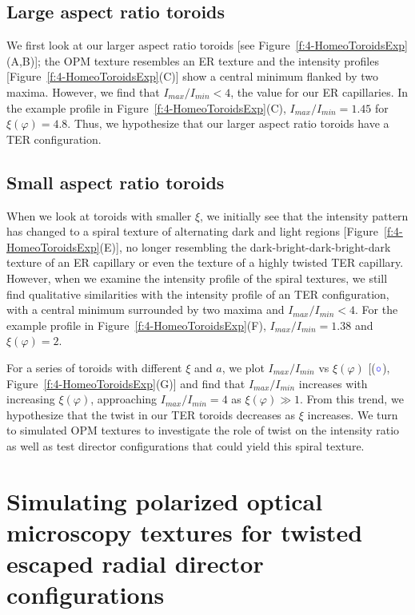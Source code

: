 \subsection{Large aspect ratio toroids}
We first look at our larger aspect ratio toroids [see Figure~\ref{f:4-HomeoToroidsExp}(A,B)]; the OPM texture resembles an ER texture and the intensity profiles [Figure~\ref{f:4-HomeoToroidsExp}(C)] show a central minimum flanked by two maxima.
However, we find that $I_{max}/I_{min} < 4$, the value for our ER capillaries.
In the example profile in Figure~\ref{f:4-HomeoToroidsExp}(C), $I_{max}/I_{min} = 1.45$ for $\xi(\varphi) = 4.8$.
Thus, we hypothesize that our larger aspect ratio toroids have a TER configuration.


\subsection{Small aspect ratio toroids}
When we look at toroids with smaller $\xi$, we initially see that the intensity pattern has changed to a spiral texture of alternating dark and light regions [Figure~\ref{f:4-HomeoToroidsExp}(E)], no longer resembling the dark-bright-dark-bright-dark texture of an ER capillary or even the texture of a highly twisted TER capillary.
However, when we examine the intensity profile of the spiral textures, we still find qualitative similarities with the intensity profile of an TER configuration, with a central minimum surrounded by two maxima and $I_{max}/I_{min} < 4$.
For the example profile in Figure~\ref{f:4-HomeoToroidsExp}(F), $I_{max}/I_{min} =1.38$ and $\xi(\varphi) = 2$.

For a series of toroids with different $\xi$ and $a$, we plot $I_{max}/I_{min}$ vs $\xi(\varphi)$ [(${\color{blue} \circ}$), Figure~\ref{f:4-HomeoToroidsExp}(G)] and find that $I_{max}/I_{min}$ increases with increasing $\xi(\varphi)$, approaching $I_{max}/I_{min} = 4$ as $\xi(\varphi) \gg 1$.
From this trend, we hypothesize that the twist in our TER toroids decreases as $\xi$ increases.
We turn to simulated OPM textures to investigate the role of twist on the intensity ratio as well as test director configurations that could yield this spiral texture.


\section{Simulating polarized optical microscopy textures for twisted escaped radial director configurations}
